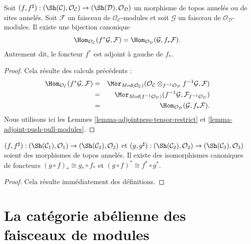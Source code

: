 \begin{lemma}
\label{lemma-adjoint-pullback-pushforward-modules}
Soit
$(f, f^\sharp) :
(\Sh(\mathcal{C}), \mathcal{O}_\mathcal{C})
\to
(\Sh(\mathcal{D}), \mathcal{O}_\mathcal{D})$
un morphisme de topos annelés ou de sites annelés. Soit $\mathcal{F}$ un
faisceau de $\mathcal{O}_\mathcal{C}$-modules et soit $\mathcal{G}$ un faisceau
de $\mathcal{O}_\mathcal{D}$-modules. Il existe une bijection canonique
$$
\Hom_{\mathcal{O}_\mathcal{C}}(f^*\mathcal{G}, \mathcal{F})
=
\Hom_{\mathcal{O}_\mathcal{D}}(\mathcal{G}, f_*\mathcal{F}).
$$
Autrement dit, le foncteur $f^*$ est adjoint à gauche de $f_*$.
\end{lemma}

\begin{proof}
Cela résulte des calculs précédents :
\begin{eqnarray*}
\Hom_{\mathcal{O}_\mathcal{C}}(f^*\mathcal{G}, \mathcal{F})
& = &
\Mor_{\textit{Mod}(\mathcal{O}_\mathcal{C})}(
\mathcal{O}_\mathcal{C}
\otimes_{f^{-1}\mathcal{O}_\mathcal{D}} f^{-1}\mathcal{G},
\mathcal{F}) \\
& = &
\Mor_{\textit{Mod}(f^{-1}\mathcal{O}_\mathcal{D})}(
f^{-1}\mathcal{G}, \mathcal{F}_{f^{-1}\mathcal{O}_\mathcal{D}}) \\
& = &
\Hom_{\mathcal{O}_\mathcal{D}}(\mathcal{G}, f_*\mathcal{F}).
\end{eqnarray*}
Nous utilisons ici les Lemmes \ref{lemma-adjointness-tensor-restrict} et
\ref{lemma-adjoint-push-pull-modules}.
\end{proof}

\begin{lemma}
\label{lemma-push-pull-composition-modules}
$(f, f^\sharp) :
(\Sh(\mathcal{C}_1), \mathcal{O}_1)
\to (\Sh(\mathcal{C}_2), \mathcal{O}_2)$ et
$(g, g^\sharp) :
(\Sh(\mathcal{C}_2), \mathcal{O}_2) \to
(\Sh(\mathcal{C}_3), \mathcal{O}_3)$
soient des morphismes de topos annelés. Il existe des isomorphismes canoniques
de foncteurs
$(g \circ f)_* \cong g_* \circ f_*$ et
$(g \circ f)^* \cong f^* \circ g^*$.
\end{lemma}

\begin{proof}
Cela résulte immédiatement des définitions.
\end{proof}





\section{La catégorie abélienne des faisceaux de modules}
\label{section-kernels}


